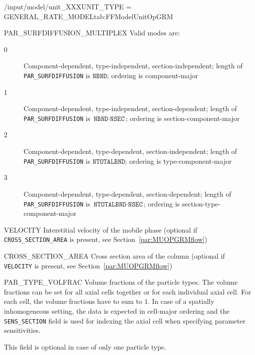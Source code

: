 \begin{condsubgroup}{/input/model/unit\_XXX}{UNIT\_TYPE = GENERAL\_RATE\_MODEL}{tab:FFModelUnitOpGRM}
\begin{dataset}[unit=--,type=int,range={$\{0, \dots, 3 \}$},length={1}]{PAR\_SURFDIFFUSION\_MULTIPLEX}
    Valid modes are:
    \begin{description}
      \item[0] Component-dependent, type-independent, section-independent; length of \texttt{PAR\_SURFDIFFUSION} is $\texttt{NBND}$; ordering is component-major
      \item[1] Component-dependent, type-independent, section-dependent; length of \texttt{PAR\_SURFDIFFUSION} is $\texttt{NBND} \cdot \texttt{NSEC}$; ordering is section-component-major
      \item[2] Component-dependent, type-dependent, section-independent; length of \texttt{PAR\_SURFDIFFUSION} is $\texttt{NTOTALBND}$; ordering is type-component-major
      \item[3] Component-dependent, type-dependent, section-dependent; length of \texttt{PAR\_SURFDIFFUSION} is $\texttt{NTOTALBND} \cdot \texttt{NSEC}$; ordering is section-type-component-major
    \end{description}\vspace{-\baselineskip}
  \end{dataset}
  \begin{dataset}[unit=\si{\metre\per\second},type=double,range={$\mathds{R}$},length={$1$ / \texttt{NSEC}}]{VELOCITY}
    Interstitial velocity of the mobile phase (optional if \texttt{CROSS\_SECTION\_AREA} is present, see Section~\ref{par:MUOPGRMflow})
  \end{dataset}
  \begin{dataset}[unit=\si{\square\metre},type=double,range={$>0$},length={1}]{CROSS\_SECTION\_AREA}
    Cross section area of the column (optional if \texttt{VELOCITY} is present, see Section~\ref{par:MUOPGRMflow})
  \end{dataset}
  \begin{dataset}[unit=--,type=double,range={$[0,1]$},length={\texttt{NPARTYPE} / $\texttt{NCOL} \cdot \texttt{NPARTYPE}$}]{PAR\_TYPE\_VOLFRAC}
    Volume fractions of the particle types.
    The volume fractions can be set for all axial cells together or for each individual axial cell.
    For each cell, the volume fractions have to sum to $1$.
    In case of a spatially inhomogeneous setting, the data is expected in cell-major ordering and the \texttt{SENS\_SECTION} field is used for indexing the axial cell when specifying parameter sensitivities.

    This field is optional in case of only one particle type.
  \end{dataset}
\end{condsubgroup}


